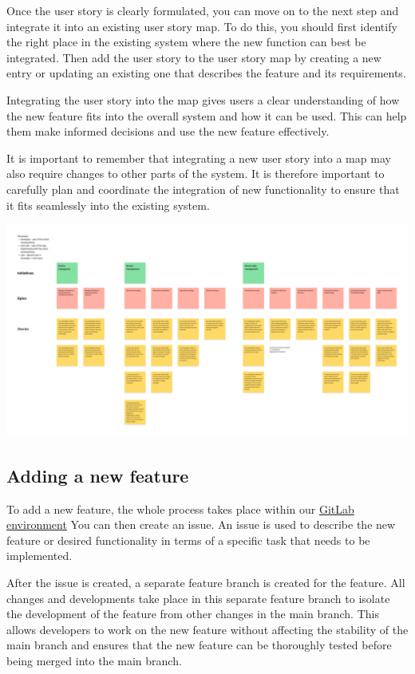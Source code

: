 \documentclass[12pt]{article}
\newcounter{fr}
\begin{document}
Once the user story is clearly formulated, you can move on to the next step and integrate it into an existing user story map. To do this, you should first identify the right place in the existing system where the new function can best be integrated. Then add the user story to the user story map by creating a new entry or updating an existing one that describes the feature and its requirements.

Integrating the user story into the map gives users a clear understanding of how the new feature fits into the overall system and how it can be used. This can help them make informed decisions and use the new feature effectively.

It is important to remember that integrating a new user story into a map may also require changes to other parts of the system. It is therefore important to carefully plan and coordinate the integration of new functionality to ensure that it fits seamlessly into the existing system.

 \includegraphics[width=\textwidth]{user_story_map.png}
 

\subsection{Adding a new feature}

To add a new feature, the whole process takes place within our \href{https://gitlab.uni-ulm.de/se-anwendungsprojekt-22-23}{GitLab environment}
You can then create an issue. An issue is used to describe the new feature or desired functionality in terms of a specific task that needs to be implemented.

After the issue is created, a separate feature branch is created for the feature. All changes and developments take place in this separate feature branch to isolate the development of the feature from other changes in the main branch. This allows developers to work on the new feature without affecting the stability of the main branch and ensures that the new feature can be thoroughly tested before being merged into the main branch.
\end{document}
